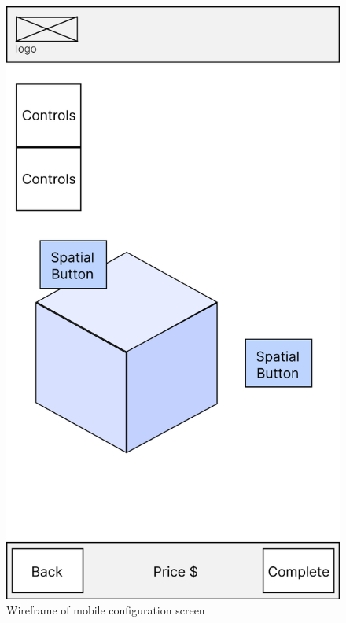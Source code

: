 \begin{figure}[h]
    \centering
    \begin{minipage}{0.35\textwidth}
        \centering
        \includegraphics[width=\linewidth]{images/wireframe_configuration_mobile_default.png}
        \caption{Wireframe of mobile configuration screen}
        \label{fig:wireframe-configuration-mobile}
    \end{minipage}\hspace{1cm}
    \begin{minipage}{0.35\textwidth}

\end{minipage}
\end{figure}
